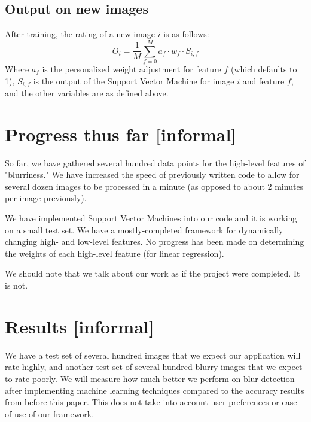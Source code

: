 \documentclass[11pt,letter]{article}
\begin{document}
\subsection{Output on new images}
After training, the rating of a new image $i$ is as follows:
\[
O_i=\frac{1}{M}\displaystyle\sum\limits_{f=0}^Ma_f \cdot w_f \cdot S_{i,f}
\]
Where $a_f$ is the personalized weight adjustment for feature $f$ (which defaults to 1), $S_{i,f}$ is the output of the Support Vector Machine for image $i$ and feature $f$, and the other variables are as defined above.


\section{Progress thus far [informal]}
So far, we have gathered several hundred data points for the high-level features of "blurriness." We have increased the speed of previously written code to allow for several dozen images to be processed in a minute (as opposed to about 2 minutes per image previously).

We have implemented Support Vector Machines into our code and it is working on a small test set. We have a mostly-completed framework for dynamically changing high- and low-level features. No progress has been made on determining the weights of each high-level feature (for linear regression).

We should note that we talk about our work as if the project were completed. It is not.


\section{Results [informal]}
We have a test set of several hundred images that we expect our application will rate highly, and another test set of several hundred blurry images that we expect to rate poorly. We will measure how much better we perform on blur detection after implementing machine learning techniques compared to the accuracy results from before this paper. This does not take into account user preferences or ease of use of our framework.




\end{document}
